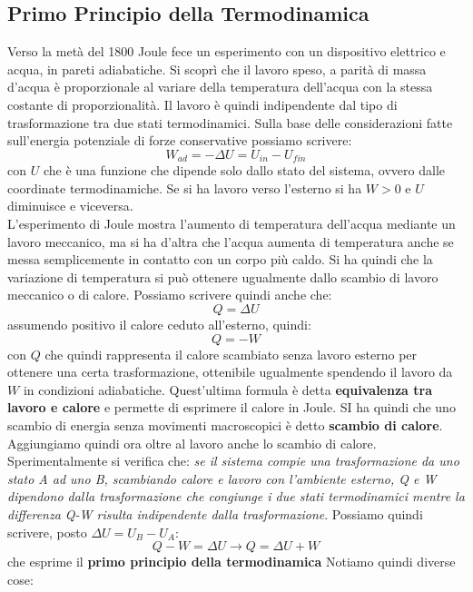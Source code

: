 \documentclass[a4paper,12pt, oneside]{book}
\begin{document}
\subsection{Primo Principio della Termodinamica}
Verso la metà del 1800 Joule fece un esperimento con un dispositivo elettrico e acqua, in pareti adiabatiche. Si scoprì che il lavoro speso, a parità di massa d'acqua è proporzionale al variare della temperatura dell'acqua con la stessa costante di proporzionalità. Il lavoro è quindi indipendente dal tipo di trasformazione tra due stati termodinamici. Sulla base delle considerazioni fatte sull'energia potenziale di forze conservative possiamo scrivere:
$$W_{ad}=-\Delta U=U_{in}-U_{fin}$$
con $U$ che è una funzione che dipende solo dallo stato del sistema, ovvero dalle coordinate termodinamiche. Se si ha lavoro verso l'esterno si ha $W>0$ e $U$ diminuisce e viceversa. \\
L'esperimento di Joule mostra l'aumento di temperatura dell'acqua mediante un lavoro meccanico, ma si ha d'altra che l'acqua aumenta di temperatura anche se messa semplicemente in contatto con un corpo più caldo. Si ha quindi che la variazione di temperatura si può ottenere ugualmente dallo scambio di lavoro meccanico o di calore. Possiamo scrivere quindi anche che:
$$Q=\Delta U$$
assumendo positivo il calore ceduto all'esterno, quindi:
$$Q=-W$$
con $Q$ che quindi rappresenta il calore scambiato senza lavoro esterno per ottenere una certa trasformazione, ottenibile ugualmente spendendo il lavoro da $W$ in condizioni adiabatiche. Quest'ultima formula è detta \textbf{equivalenza tra lavoro e calore} e permette di esprimere il calore in Joule. SI ha quindi che uno scambio di energia senza movimenti macroscopici è detto \textbf{scambio di calore}.
Aggiungiamo quindi ora oltre al lavoro anche lo scambio di calore. Sperimentalmente si verifica che: \textit{se il sistema compie una trasformazione da uno stato A ad uno B, scambiando calore e lavoro con l'ambiente esterno, Q e W dipendono dalla trasformazione che congiunge i due stati termodinamici mentre la differenza Q-W risulta indipendente dalla trasformazione}. Possiamo quindi scrivere, posto $\Delta U=U_B-U_A$:
$$Q-W=\Delta U\longrightarrow Q=\Delta U+W$$
che esprime il \textbf{primo principio della termodinamica}
Notiamo quindi diverse cose:
\end{document}
